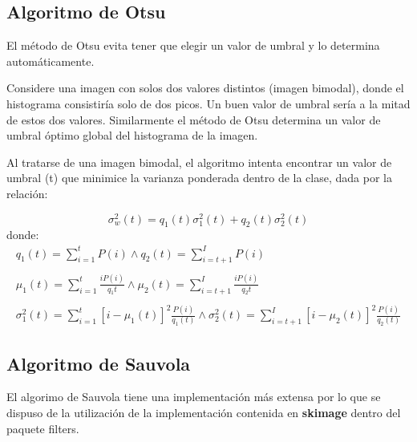 \subsection{Algoritmo de Otsu}
El método de Otsu evita tener que elegir un valor de umbral y lo determina automáticamente.

Considere una imagen con solos dos valores distintos (imagen bimodal), donde el histograma consistiría solo de dos picos. Un buen valor de umbral sería a la mitad de estos dos valores. Similarmente el método de Otsu determina un valor de umbral óptimo global del histograma de la imagen.

Al tratarse de una imagen bimodal, el algoritmo intenta encontrar un valor de umbral (t) que minimice la varianza ponderada dentro de la clase, dada por la relación:

\begin{equation}
	\sigma _ {w} ^{2}(t) = q_{1}(t) \sigma _{1}^2(t) + q_{2}(t) \sigma _{2}^2(t)
\end{equation}
donde:
\begin{equation}
	\begin{array}{l}
		q_{1}(t) = \sum_{i=1}^{t} P(i) \wedge q_{2}(t) = \sum_{i=t+1}^{I} P(i)\\\\
		\mu_{1}(t) = \sum_{i=1}^{t} \frac{i P(i)}{q_1{t}} \wedge \mu_{2}(t) = \sum_{i=t+1}^{I} \frac{i P(i)}{q_2{t}}\\\\
		\sigma_{1}^2(t) = \sum_{i = 1}^{t} [i - \mu_{1}(t)]^2 \frac{P(i)}{q_{1}(t)} \wedge \sigma_{2}^2(t) = \sum_{i = t+1}^{I} [i - \mu_{2}(t)]^2 \frac{P(i)}{q_{2}(t)}
	\end{array}
\end{equation}



\subsection{Algoritmo de Sauvola}

El algorimo de Sauvola tiene una implementación más extensa por lo que se dispuso de la utilización de la implementación contenida en \textbf{skimage} dentro del paquete filters.



